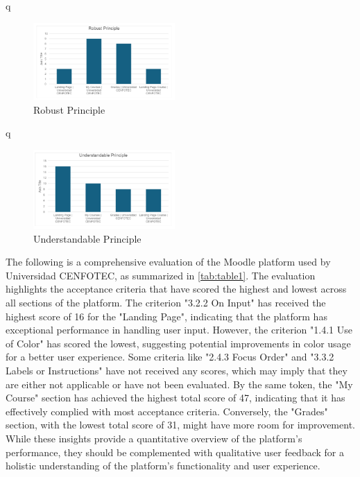 \documentclass{IEEEtran}
\begin{document}
q
\begin{figure}[H]
    \includegraphics[width=0.48\textwidth]{images/robustPrinciple.png}
    \caption{Robust Principle}
    \label{fig:figure6}
\end{figure}
q
\begin{figure}[H]
    \includegraphics[width=0.48\textwidth]{images/undestandablePrinciple.png}
    \caption{Understandable Principle}
    \label{fig:figure7}
\end{figure}


The following is a comprehensive evaluation of the Moodle platform used by Universidad CENFOTEC, as summarized in \ref{tab:table1}. The evaluation highlights the acceptance criteria that have scored the highest and lowest across all sections of the platform. The criterion "3.2.2 On Input" has received the highest score of 16 for the "Landing Page", indicating that the platform has exceptional performance in handling user input. However, the criterion "1.4.1 Use of Color" has scored the lowest, suggesting potential improvements in color usage for a better user experience. Some criteria like "2.4.3 Focus Order" and "3.3.2 Labels or Instructions" have not received any scores, which may imply that they are either not applicable or have not been evaluated. By the same token, the "My Course" section has achieved the highest total score of 47, indicating that it has effectively complied with most acceptance criteria. Conversely, the "Grades" section, with the lowest total score of 31, might have more room for improvement. While these insights provide a quantitative overview of the platform's performance, they should be complemented with qualitative user feedback for a holistic understanding of the platform's functionality and user experience.
\end{document}
